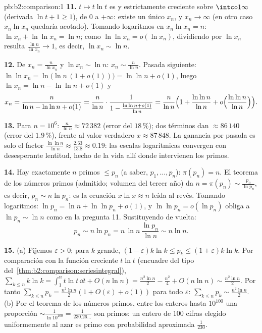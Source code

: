 \begin{solution}{pb:b2:comparison:1}
\textbf{11.} $t \mapsto t\ln t$ es  y estrictamente
creciente sobre $\intco1\infty$ (derivada $\ln t + 1 \geq 1$), de
$0$ a $+\infty$: existe un único $x_n$, y $x_n \to \infty$ (en
otro caso $x_n\ln x_n$ quedaría acotado). Tomando logaritmos en
$x_n\ln x_n = n$: $\ln x_n + \ln\ln x_n = \ln n$; como $\ln\ln
x_n = o(\ln x_n)$, dividiendo por $\ln x_n$ resulta $\frac{\ln
n}{\ln x_n} \to 1$, es decir, $\ln x_n \sim \ln n$.

\textbf{12.} De $x_n = \frac{n}{\ln x_n}$ y $\ln x_n \sim \ln n$:
$x_n \sim \frac{n}{\ln n}$. Pasada siguiente: $\ln\ln x_n =
\ln\bigl(\ln n\,(1 + o(1))\bigr) = \ln\ln n + o(1)$, luego $\ln
x_n = \ln n - \ln\ln n + o(1)$ y
\[
x_n = \frac{n}{\ln n - \ln\ln n + o(1)}
= \frac{n}{\ln n}\cdot\frac{1}{1 - \frac{\ln\ln n +
o(1)}{\ln n}}
= \frac{n}{\ln n}\Bigl(1 + \frac{\ln\ln n}{\ln n} +
o\Bigl(\frac{\ln\ln n}{\ln n}\Bigr)\Bigr).
\]

\textbf{13.} Para $n = 10^6$: $\frac{n}{\ln n} \approx 72\,382$
(error del $18\,\%$); dos términos dan $\approx 86\,140$ (error
del $1.9\,\%$), frente al valor verdadero $x \approx 87\,848$. La
ganancia por pasada es solo el factor $\frac{\ln\ln n}{\ln n}
\approx \frac{2.63}{13.8} \approx 0.19$: las escalas logarítmicas
convergen con desesperante lentitud, hecho de la vida allí donde
intervienen los primos.

\textbf{14.} Hay exactamente $n$ primos $\leq p_n$ (a saber,
$p_1, \dots, p_n$): $\pi(p_n) = n$. El teorema de los números
primos (admitido; volumen del tercer año) da $n = \pi(p_n) \sim
\frac{p_n}{\ln p_n}$, es decir, $p_n \sim n\ln p_n$: es la
ecuación $x\ln x \approx n$ leída al revés. Tomando logaritmos:
$\ln p_n = \ln n + \ln\ln p_n + o(1)$, y $\ln\ln p_n = o(\ln
p_n)$ obliga a $\ln p_n \sim \ln n$ como en la pregunta 11.
Sustituyendo de vuelta:
\[
p_n \sim n\ln p_n = n\,\ln n\,\frac{\ln p_n}{\ln n} \sim n\ln
n .
\]

\textbf{15.} (a) Fijemos $\varepsilon > 0$; para $k$ grande, $(1
- \varepsilon)k\ln k \leq p_k \leq (1 + \varepsilon)k\ln k$. Por
comparación con la función creciente $t\ln t$ (encuadre del tipo
del~\cref{thm:b2:comparison:seriesintegral}), $\sum_{k\leq n}k\ln
k = \int_1^n t\ln t\,\dd t + O(n\ln n) = \frac{n^2\ln n}2 -
\frac{n^2}4 + O(n\ln n) \sim \frac{n^2\ln n}2$. Por tanto
$\sum_{k\leq n}p_k = \frac{n^2\ln n}{2}(1 + O(\varepsilon) +
o(1))$ para todo $\varepsilon$: $\sum_{k\leq n}p_k \sim
\frac{n^2\ln n}2$. (b) Por el teorema de los números primos,
entre los enteros hasta $10^{100}$ una proporción $\sim
\frac{1}{\ln 10^{100}} = \frac1{230.26\dots}$ son primos: un
entero de $100$ cifras elegido uniformemente al azar es primo con
probabilidad aproximada $\frac1{230}$.


\end{solution}
